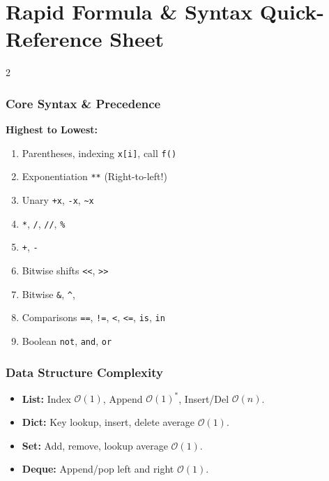 \chapter*{Rapid Formula \& Syntax Quick-Reference Sheet}

\begin{multicols}{2}
\subsection*{Core Syntax \& Precedence}
\textbf{Highest to Lowest:}
\begin{enumerate}[leftmargin=1.2em, itemsep=1pt]
    \item Parentheses, indexing \texttt{x[i]}, call \texttt{f()}
    \item Exponentiation \texttt{**} (Right-to-left!)
    \item Unary \texttt{+x}, \texttt{-x}, \texttt{\textasciitilde x}
    \item \texttt{*}, \texttt{/}, \texttt{//}, \texttt{\%}
    \item \texttt{+}, \texttt{-}
    \item Bitwise shifts \texttt{<<}, \texttt{>>}
    \item Bitwise \texttt{\&}, \texttt{\textasciicircum}, \texttt{\textbar}
    \item Comparisons \texttt{==}, \texttt{!=}, \texttt{<}, \texttt{<=}, \texttt{is}, \texttt{in}
    \item Boolean \texttt{not}, \texttt{and}, \texttt{or}
\end{enumerate}

\subsection*{Data Structure Complexity}
\begin{itemize}[leftmargin=1.2em, itemsep=1pt]
    \item \textbf{List:} Index $\mathcal{O}(1)$, Append $\mathcal{O}(1)^*$, Insert/Del $\mathcal{O}(n)$.
    \item \textbf{Dict:} Key lookup, insert, delete average $\mathcal{O}(1)$.
    \item \textbf{Set:} Add, remove, lookup average $\mathcal{O}(1)$.
    \item \textbf{Deque:} Append/pop left and right $\mathcal{O}(1)$.
\end{itemize}


\end{multicols}
